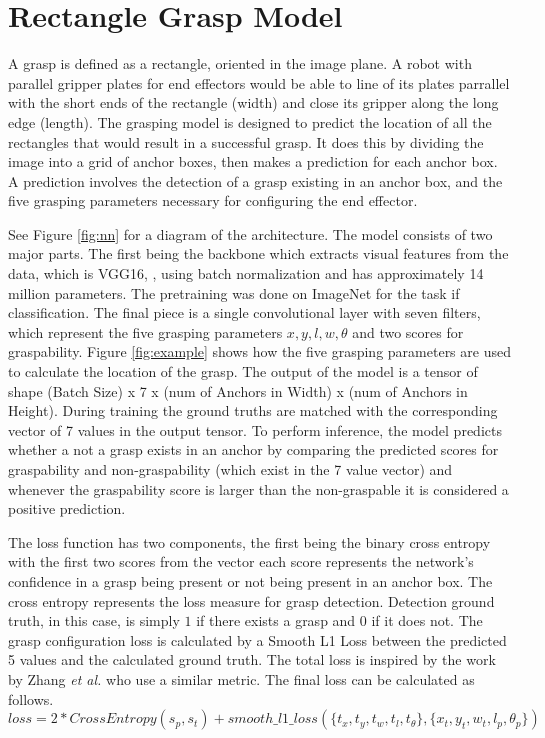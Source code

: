 \documentclass{article}
\begin{document}
\newpage
\section{Rectangle Grasp Model}
A grasp is defined as a rectangle, oriented in the image plane. A robot with
parallel gripper plates for end effectors would be able to line of its plates
parrallel with the short ends of the rectangle (width) and close its gripper along the
long edge (length). The grasping model is designed to predict the location of all
the rectangles that would result in a successful grasp. It does this by dividing the
image into a grid of anchor boxes, then makes a prediction for each anchor box. A
prediction involves the detection of a grasp existing in an anchor box, and the five
grasping parameters necessary for configuring the end effector.

See Figure \ref{fig:nn} for a diagram of the architecture.
The model consists of two major parts. The first being the backbone which extracts
visual features from the data, which is VGG16, \cite{simonyan14},
using batch normalization and has approximately 14 million parameters. The
pretraining was done on ImageNet for the task if classification.
The final
piece is a single convolutional layer with seven filters, which represent the
five grasping parameters $x, y, l, w, \theta$ and two scores for graspability.
Figure \ref{fig:example} shows how the five grasping parameters are used to
calculate the location of the grasp. The output of the model is a tensor of
shape (Batch Size) x 7 x (num of Anchors in Width) x (num of Anchors in Height).
During training the ground truths are matched with the corresponding vector of
7 values in the output tensor. To perform inference, the model predicts
whether a not a grasp exists in an anchor by comparing the predicted scores
for graspability and non-graspability (which exist in the 7 value vector)
and whenever the graspability score is larger than the non-graspable it
is considered a positive prediction.

The loss function has two components, the first being the binary cross entropy
with the first two scores from the vector each score represents the network's
confidence in a grasp being present or not being present in an anchor box.
The cross entropy
represents the loss measure for grasp detection. Detection ground truth, in
this case, is simply $1$ if there exists a grasp and $0$ if it does not.
The grasp configuration loss is calculated by a Smooth L1 Loss between
the predicted 5 values and the calculated ground truth. The total loss is inspired
by the work by Zhang \textit{et al.} \cite{zhang18} who use a similar metric.
The final loss can be calculated as follows.
\begin{equation*}
loss = 2*CrossEntropy(s_p, s_t) + smooth\_l1\_loss(\{t_x, t_y, t_w, t_l, t_\theta\}, \{x_t, y_t, w_t, l_p, \theta_p\})
\end{equation*}
\end{document}
